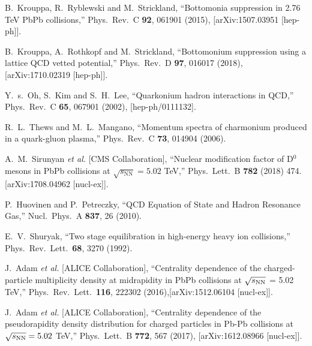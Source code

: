 \documentclass[12pt,a4paper,final]{iopart} %
\begin{document}
\begin{thebibliography}{100}
  B.~Krouppa, R.~Ryblewski and M.~Strickland,
  ``Bottomonia suppression in 2.76 TeV PbPb collisions,'' 
  Phys.\ Rev.\ C {\bf 92}, 061901 (2015),
  [arXiv:1507.03951 [hep-ph]].
  
  B.~Krouppa, A.~Rothkopf and M.~Strickland,
  ``Bottomonium suppression using a lattice QCD vetted potential,''
  Phys.\ Rev.\ D {\bf 97}, 016017 (2018), [arXiv:1710.02319 [hep-ph]].



  

  Y.~s.~Oh, S.~Kim and S.~H.~Lee,
  ``Quarkonium hadron interactions in QCD,''
  Phys.\ Rev.\ C {\bf 65}, 067901 (2002),
  [hep-ph/0111132].

  
  R.~L.~Thews and M.~L.~Mangano,
  ``Momentum spectra of charmonium produced in a quark-gluon plasma,''
  Phys.\ Rev.\ C {\bf 73}, 014904 (2006).


  A.~M.~Sirunyan {\it et al.} [CMS Collaboration],
  ``Nuclear modification factor of D$^0$ mesons in PbPb collisions at  $\sqrt{s_\mathrm{NN}} = 5.02$ TeV,''
  Phys.\ Lett.\ B {\bf 782} (2018) 474.  [arXiv:1708.04962 [nucl-ex]].

  P.~Huovinen and P.~Petreczky,
  ``QCD Equation of State and Hadron Resonance Gas,''
  Nucl.\ Phys.\ A {\bf 837}, 26 (2010).

  E.~V.~Shuryak,
  ``Two stage equilibration in high-energy heavy ion collisions,''
  Phys.\ Rev.\ Lett.\  {\bf 68}, 3270 (1992).

  J.~Adam {\it et al.} [ALICE Collaboration],
  ``Centrality dependence of the charged-particle multiplicity density at midrapidity in PbPb collisions at $\sqrt{s_{\rm NN}}$ = 5.02 TeV,''
  Phys.\ Rev.\ Lett.\  {\bf 116}, 222302 (2016),[arXiv:1512.06104 [nucl-ex]].
  

  J.~Adam {\it et al.} [ALICE Collaboration],
  ``Centrality dependence of the pseudorapidity density distribution for charged particles
  in Pb-Pb collisions at $\sqrt{s_{\rm NN}}=5.02$ TeV,''
  Phys.\ Lett.\ B {\bf 772}, 567 (2017),
  [arXiv:1612.08966 [nucl-ex]].




\end{thebibliography}
\end{document}
